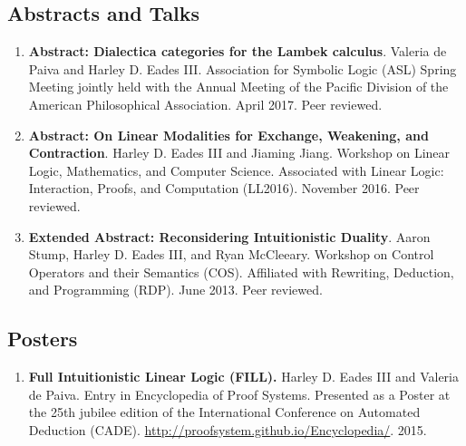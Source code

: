 \documentclass{article}
\begin{document}
  \subsection{Abstracts and Talks}
  \label{subsec:abstracts_and_talks}
  \begin{enumerate}

  \item \textbf{Abstract: Dialectica categories for the Lambek
    calculus}.  Valeria de Paiva and Harley D. Eades III. Association for
    Symbolic Logic (ASL) Spring Meeting jointly held with the Annual
    Meeting of the Pacific Division of the American Philosophical
    Association.  April 2017.  Peer reviewed.
    
  \item \textbf{Abstract: On Linear Modalities for Exchange,
    Weakening, and Contraction}.  Harley D. Eades III and Jiaming Jiang.
    Workshop on Linear Logic, Mathematics, and Computer
    Science. Associated with Linear Logic: Interaction, Proofs, and
    Computation (LL2016).  November 2016.  Peer reviewed.    

  \item \textbf{Extended Abstract: Reconsidering Intuitionistic
    Duality}.  Aaron Stump, Harley D. Eades III, and Ryan
    McCleeary. Workshop on Control Operators and their Semantics
    (COS).  Affiliated with Rewriting, Deduction, and Programming
    (RDP). June 2013. Peer reviewed.

  \end{enumerate}
  
  \subsection{Posters}
  \label{subsec:posters}
  \begin{enumerate}
  \item \textbf{Full Intuitionistic Linear Logic (FILL).} Harley D. Eades
    III and Valeria de Paiva. Entry in Encyclopedia of Proof
    Systems. Presented as a Poster at the 25th jubilee edition of the
    International Conference on Automated Deduction (CADE). \url{http://proofsystem.github.io/Encyclopedia/}. 2015.
  \end{enumerate}
\end{document}
